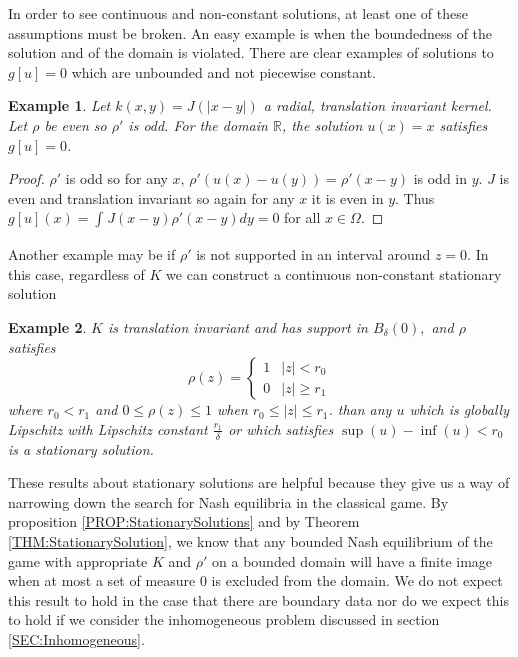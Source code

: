 \documentclass[aps,
preprint,
groupedaddress,
showkeys,
amsmath]{revtex4-2}
\newtheorem{example}{Example}
\DeclareMathOperator{\Rn}{\mathbb{R}^n}
\begin{document}
    In order to see continuous and non-constant solutions, at least one of these assumptions must be broken. An easy example is when the boundedness of the solution and of the domain is violated. There are clear examples of solutions to $g[u]=0$ which are unbounded and not piecewise constant. 
    \begin{example}\label{EX:NonconstantStationarySolution}
        Let $k(x,y)=J(|x-y|)$ a radial, translation invariant kernel. Let $\rho$ be even so $\rho'$ is odd. For the domain $\mathbb{R}$, the solution $u(x)=x$ satisfies $g[u]=0$. 
    \end{example}
    \begin{proof}
        $\rho'$ is odd so for any $x$, $\rho'(u(x)-u(y))=\rho'(x-y)$ is odd in $y$. $J$ is even and translation invariant so again for any $x$ it is even in $y$. Thus $g[u](x)=\int_{\Rn}J(x-y)\rho'(x-y)dy=0$ for all $x\in \Omega$. 
    \end{proof}

    Another example may be if $\rho'$ is not supported in an interval around $z=0$. In this case, regardless of $K$ we can construct a continuous non-constant stationary solution
    
    \begin{example}
        $K$ is translation invariant and has support in $B_\delta(0),$ and $\rho$ satisfies 
        \[
            \rho(z) =\begin{cases}
            1&|z|<r_0\\
            0&|z|\geq r_1
        \end{cases}
        \]
          where $r_0 <r_1$ and  $0\leq \rho(z) \leq 1$ when $r_0\leq |z|\leq r_1$.
    than any $u$ which is globally Lipschitz with Lipschitz constant $\frac{r_1}{\delta}$ or which satisfies $\sup(u)-\inf(u)<r_0$ is a stationary solution.
    \end{example}

    These results about stationary solutions are helpful because they give us a way of narrowing down the search for Nash equilibria in the classical game. By proposition \ref{PROP:StationarySolutions} and by Theorem \ref{THM:StationarySolution}, we know that any bounded Nash equilibrium of the game with appropriate $K$ and $\rho'$ on a bounded domain will have a finite image when at most a set of measure 0 is excluded from the domain. We do not expect this result to hold in the case that there are boundary data nor do we expect this to hold if we consider the inhomogeneous problem discussed in section \ref{SEC:Inhomogeneous}.
\end{document}
